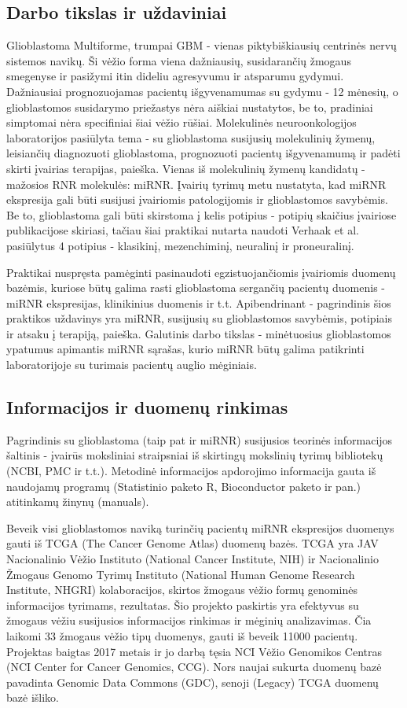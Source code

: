 \documentclass[a4paper,12pt]{article}
\begin{document}
\subsection{Darbo tikslas ir uždaviniai}
\indent\indent
Glioblastoma Multiforme, trumpai GBM - vienas piktybiškiausių centrinės nervų sistemos navikų. Ši vėžio forma viena dažniausių, susidarančių žmogaus smegenyse ir pasižymi itin dideliu agresyvumu ir atsparumu gydymui. Dažniausiai prognozuojamas pacientų išgyvenamumas su gydymu - 12 mėnesių\cite{gliosurvival}, o glioblastomos susidarymo priežastys nėra aiškiai nustatytos, be to, pradiniai simptomai nėra specifiniai šiai vėžio rūšiai. Molekulinės neuroonkologijos laboratorijos pasiūlyta tema - su glioblastoma susijusių molekulinių žymenų, leisiančių diagnozuoti glioblastoma, prognozuoti pacientų išgyvenamumą ir padėti skirti įvairias terapijas, paieška. Vienas iš molekulinių žymenų kandidatų - mažosios RNR molekulės: miRNR. Įvairių tyrimų metu nustatyta, kad miRNR ekspresija gali būti susijusi įvairiomis patologijomis ir glioblastomos savybėmis. Be to, glioblastoma gali būti skirstoma į kelis potipius - potipių skaičius įvairiose publikacijose skiriasi, tačiau šiai praktikai nutarta naudoti Verhaak et al.\cite{verhaak} pasiūlytus 4 potipius - klasikinį, mezenchiminį, neuralinį ir proneuralinį.

Praktikai nuspręsta pamėginti pasinaudoti egzistuojančiomis įvairiomis duomenų bazėmis, kuriose būtų galima rasti glioblastoma sergančių pacientų duomenis - miRNR ekspresijas, klinikinius duomenis ir t.t. Apibendrinant - pagrindinis šios praktikos uždavinys yra miRNR, susijusių su glioblastomos savybėmis, potipiais ir atsaku į terapiją, paieška. Galutinis darbo tikslas - minėtuosius glioblastomos ypatumus apimantis miRNR sąrašas, kurio miRNR būtų galima patikrinti laboratorijoje su turimais pacientų auglio mėginiais.

\subsection{Informacijos ir duomenų rinkimas}
\indent\indent
Pagrindinis su glioblastoma (taip pat ir miRNR) susijusios teorinės informacijos šaltinis - įvairūs moksliniai straipsniai iš skirtingų mokslinių tyrimų bibliotekų (NCBI, PMC ir t.t.). Metodinė informacijos apdorojimo informacija gauta iš naudojamų programų (Statistinio paketo R, Bioconductor paketo ir pan.) atitinkamų žinynų (manuals).

Beveik visi glioblastomos naviką turinčių pacientų miRNR ekspresijos duomenys gauti iš TCGA (The Cancer Genome Atlas) duomenų bazės. TCGA yra JAV Nacionalinio Vėžio Instituto (National Cancer Institute, NIH) ir Nacionalinio Žmogaus Genomo Tyrimų Instituto (National Human Genome Research Institute, NHGRI) kolaboracijos, skirtos žmogaus vėžio formų genominės informacijos tyrimams, rezultatas. Šio projekto paskirtis yra efektyvus su žmogaus vėžiu susijusios informacijos rinkimas ir mėginių analizavimas. Čia laikomi 33 žmogaus vėžio tipų duomenys, gauti iš beveik 11000 pacientų. Projektas baigtas 2017 metais ir jo darbą tęsia NCI Vėžio Genomikos Centras (NCI Center for Cancer Genomics, CCG). Nors naujai sukurta duomenų bazė pavadinta Genomic Data Commons (GDC), senoji (Legacy) TCGA duomenų bazė išliko.
\end{document}

